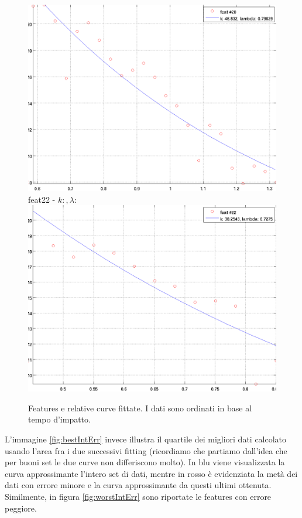 \documentclass[12pt]{report}
\begin{document}
\begin{figure}[H]
\begin{minipage}[t]{0.5\linewidth}
	\includegraphics[scale=\imFeat]{images/feat20}\\
	feat22 - $k: , \lambda:  $\\
	\includegraphics[scale=\imFeat]{images/feat22}\\
\end{minipage}
\caption[short]{Features e relative curve fittate. I dati sono ordinati in base al tempo d'impatto.}
\label{fig:feats4}
\end{figure}



\nwapage
\noindent L'immagine \ref{fig:bestIntErr} invece illustra il quartile dei migliori dati calcolato usando l'area fra i due successivi fitting (ricordiamo che partiamo dall'idea che per buoni set le due curve non differiscono molto). In blu viene visualizzata la curva approssimante l'intero set di dati, mentre in rosso \`e evidenziata la met\`a dei dati con errore minore e la curva approssimante da questi ultimi ottenuta. Similmente, in figura \ref{fig:worstIntErr} sono riportate le features con errore peggiore.\\
\end{document}
